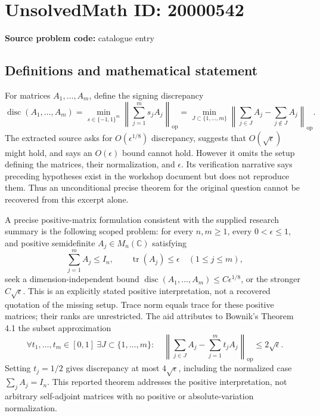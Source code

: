 \documentclass[11pt]{article}
\newcommand{\C}{\mathbb{C}}
\begin{document}
\section*{UnsolvedMath ID: 20000542}
\textbf{Source problem code:} catalogue entry
\subsection{Definitions and mathematical statement}
For matrices \(A_1,\ldots,A_m\), define the signing discrepancy
\[
 \operatorname{disc}(A_1,\ldots,A_m)=
 \min_{s\in\{-1,1\}^m}\left\|\sum_{j=1}^m s_jA_j\right\|_{\mathrm{op}}
 =\min_{J\subset\{1,\ldots,m\}}\left\|\sum_{j\in J}A_j-\sum_{j\notin J}A_j\right\|_{\mathrm{op}}.
\]
The extracted source asks for \(O(\epsilon^{1/8})\) discrepancy, suggests that \(O(\sqrt\epsilon)\) might hold, and says an \(O(\epsilon)\) bound cannot hold. However it omits the setup defining the matrices, their normalization, and \(\epsilon\). Its verification narrative says preceding hypotheses exist in the workshop document but does not reproduce them. Thus an unconditional precise theorem for the original question cannot be recovered from this excerpt alone.

A precise positive-matrix formulation consistent with the supplied research summary is the following scoped problem: for every \(n,m\geq1\), every \(0<\epsilon\leq1\), and positive semidefinite \(A_j\in M_n(\C)\) satisfying
\[
 \sum_{j=1}^m A_j\leq I_n,\qquad \operatorname{tr}(A_j)\leq\epsilon\quad(1\leq j\leq m),
\]
seek a dimension-independent bound \(\operatorname{disc}(A_1,\ldots,A_m)\leq C\epsilon^{1/8}\), or the stronger \(C\sqrt\epsilon\). This is an explicitly stated positive interpretation, not a recovered quotation of the missing setup. Trace norm equals trace for these positive matrices; their ranks are unrestricted. The aid attributes to Bownik's Theorem 4.1 the subset approximation
\[
 \forall t_1,\ldots,t_m\in[0,1]\ \exists J\subset\{1,\ldots,m\}:\quad
 \left\|\sum_{j\in J}A_j-\sum_{j=1}^m t_jA_j\right\|_{\mathrm{op}}\leq2\sqrt\epsilon.
\]
Setting \(t_j=1/2\) gives discrepancy at most \(4\sqrt\epsilon\), including the normalized case \(\sum_jA_j=I_n\). This reported theorem addresses the positive interpretation, not arbitrary self-adjoint matrices with no positive or absolute-variation normalization.
\end{document}
